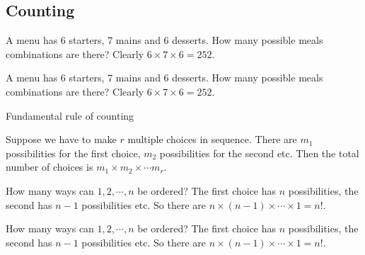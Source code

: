 \subsection{Counting}

\begin{note}
  \begin{field}
    \begin{eg}
      A menu has 6 starters, 7 mains and 6 desserts. How many possible meals combinations are there? Clearly $6 \times 7 \times 6 = 252$.
    \end{eg}
  \end{field}
  \begin{field}
    \begin{eg}
      A menu has 6 starters, 7 mains and 6 desserts. How many possible meals combinations are there? Clearly $6 \times 7 \times 6 = 252$.
    \end{eg}
  \end{field}
  \xplain{}%
\end{note}

%
\begin{note}
  \begin{field}
    Fundamental rule of counting
  \end{field}
  \begin{field}
    \begin{thm}
      Suppose we have to make $r$ multiple choices in sequence. There are $m_1$ possibilities for the first choice, $m_2$ possibilities for the second etc. Then the total number of choices is $m_1\times m_2\times \cdots m_r$.
    \end{thm}
  \end{field}
  \xplain{}%
\end{note}

\begin{note}
  \begin{field}
    \begin{eg}
      How many ways can $1, 2, \cdots, n$ be ordered? The first choice has $n$ possibilities, the second has $n - 1$ possibilities etc. So there are $n\times (n - 1)\times\cdots \times 1 = n!$.
    \end{eg}
  \end{field}
  \begin{field}
    \begin{eg}
      How many ways can $1, 2, \cdots, n$ be ordered? The first choice has $n$ possibilities, the second has $n - 1$ possibilities etc. So there are $n\times (n - 1)\times\cdots \times 1 = n!$.
    \end{eg}
  \end{field}
  \xplain{}%
\end{note}

